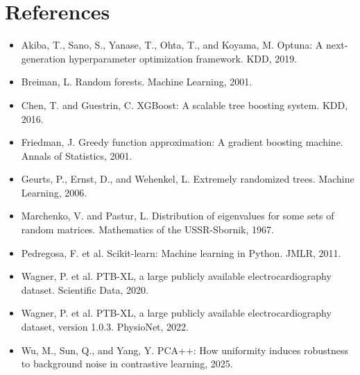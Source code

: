 \documentclass{article}
\begin{document}
\section*{References}

\begin{itemize}
\item Akiba, T., Sano, S., Yanase, T., Ohta, T., and Koyama, M. Optuna: A next-generation hyperparameter optimization framework. KDD, 2019.
\item Breiman, L. Random forests. Machine Learning, 2001.
\item Chen, T. and Guestrin, C. XGBoost: A scalable tree boosting system. KDD, 2016.
\item Friedman, J. Greedy function approximation: A gradient boosting machine. Annals of Statistics, 2001.
\item Geurts, P., Ernst, D., and Wehenkel, L. Extremely randomized trees. Machine Learning, 2006.
\item Marchenko, V. and Pastur, L. Distribution of eigenvalues for some sets of random matrices. Mathematics of the USSR-Sbornik, 1967.
\item Pedregosa, F. et al. Scikit-learn: Machine learning in Python. JMLR, 2011.
\item Wagner, P. et al. PTB-XL, a large publicly available electrocardiography dataset. Scientific Data, 2020.
\item Wagner, P. et al. PTB-XL, a large publicly available electrocardiography dataset, version 1.0.3. PhysioNet, 2022.
\item Wu, M., Sun, Q., and Yang, Y. PCA++: How uniformity induces robustness to background noise in contrastive learning, 2025.
\end{itemize}
\end{document}
